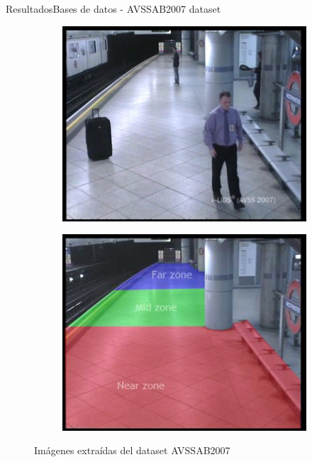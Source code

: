 \begin{frame}{Resultados}{Bases de datos - AVSSAB2007 dataset}
\begin{figure}[ht]
  \centering
  \begin{subfigure}[b]{0.28\textwidth}
    \includegraphics[width=\textwidth]{Images/resultados/datasets/AVSSAB_1.jpg}
    \caption{}
    \label{fig:AVSSAB_1}
  \end{subfigure}
  \qquad
  \begin{subfigure}[b]{0.28\textwidth}
    \includegraphics[width=\textwidth]{Images/resultados/datasets/avssab2007-zones.png}
    \caption{}
    \label{fig:AVSSAB_2}
  \end{subfigure}
  \caption{Imágenes extraídas del dataset AVSSAB2007}
  \label{fig:AVSSAB2007}
\end{figure}
    
\end{frame}

